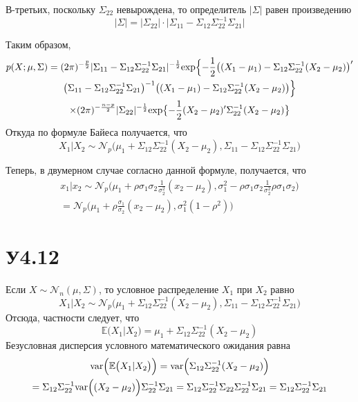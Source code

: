 \documentclass[a4paper]{article}
\newcommand{\Ncal}{\mathcal{N}}
\newcommand{\ex}[0]{{\mathbb{E}}}
\newcommand{\var}[0]{\text{var}}
\begin{document}
В-третьих, поскольку $\Sigma_{22}$ невырождена, то определитель $\lvert \Sigma\rvert$
равен произведению
\[
\lvert \Sigma\rvert
= \lvert \Sigma_{22}\rvert \cdot \lvert \Sigma_{11} - \Sigma_{12} \Sigma_{22}^{-1} \Sigma_{21}\rvert
\]

Таким образом,
\begin{multline*}
p(X;\mu,\Sigma)
= (2\pi)^{-\frac{p}{2}} \lvert \Sigma_{11} - \Sigma_{12} \Sigma_{22}^{-1} \Sigma_{21} \rvert^{-\frac{1}{2}}
	\text{exp}\Bigl\{-\frac{1}{2}\bigl( (X_1-\mu_1) - \Sigma_{12}\Sigma_{22}^{-1}(X_2-\mu_2) \bigr)'\\
		\bigl(\Sigma_{11} - \Sigma_{12} \Sigma_{22}^{-1} \Sigma_{21}\bigr)^{-1}
		\bigl( (X_1-\mu_1) - \Sigma_{12}\Sigma_{22}^{-1} (X_2-\mu_2) \bigr)\Bigr\}\\
	\times (2\pi)^{-\frac{n-p}{2}} \lvert \Sigma_{22} \rvert^{-\frac{1}{2}}
	\text{exp}\bigl\{-\frac{1}{2}(X_2-\mu_2)'\Sigma_{22}^{-1}(X_2-\mu_2)\bigr\}
\end{multline*}
Откуда по формуле Байеса получается, что 
\[
X_1\rvert X_2
\sim \Ncal_p\bigl(
	\mu_1+\Sigma_{12}\Sigma_{22}^{-1} (X_2-\mu_2),
	\Sigma_{11} - \Sigma_{12} \Sigma_{22}^{-1} \Sigma_{21}
\bigr)
\]

Теперь, в двумерном случае согласно данной формуле, получается, что
\begin{multline*}
x_1\rvert x_2
\sim \Ncal_p\bigl(
	\mu_1+\rho\sigma_1\sigma_2\frac{1}{\sigma^2_2} (x_2-\mu_2),
	\sigma^2_1 - \rho\sigma_1\sigma_2 \frac{1}{\sigma^2_2} \rho\sigma_1\sigma_2
\bigr)\\
= \Ncal_p\bigl(
	\mu_1+\rho\frac{\sigma_1}{\sigma_2} (x_2-\mu_2),
	\sigma^2_1(1 - \rho^2)
\bigr)
\end{multline*}



\section{У4.12} %
\label{sec:problem_4_12}

Если $X\sim \Ncal_n(\mu,\Sigma)$, то условное распределение $X_1$ при $X_2$ равно
\[
X_1\rvert X_2
\sim \Ncal_p\bigl(
	\mu_1+\Sigma_{12}\Sigma_{22}^{-1} (X_2-\mu_2),
	\Sigma_{11} - \Sigma_{12} \Sigma_{22}^{-1} \Sigma_{21}
\bigr)
\]
Отсюда, частности следует, что 
\[\ex\bigl( X_1 \rvert X_2 \bigr) = \mu_1 + \Sigma_{12}\Sigma_{22}^{-1} (X_2-\mu_2)\]
Безусловная дисперсия условного математического ожидания равна
\begin{multline*}
\var\Bigl(\ex\bigl( X_1 \rvert X_2 \bigr)\Bigr)
= \var\Bigl(\Sigma_{12}\Sigma_{22}^{-1} (X_2-\mu_2)\Bigr)\\
= \Sigma_{12}\Sigma_{22}^{-1} \var\Bigl((X_2-\mu_2)\Bigr) \Sigma_{22}^{-1} \Sigma_{21}
= \Sigma_{12}\Sigma_{22}^{-1} \Sigma_{22} \Sigma_{22}^{-1} \Sigma_{21}
= \Sigma_{12} \Sigma_{22}^{-1} \Sigma_{21}
\end{multline*}
\end{document}
